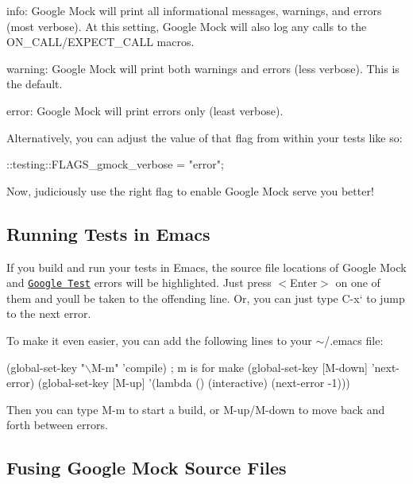 \begin{DoxyItemize}
\item {\ttfamily info}\+: Google Mock will print all informational messages, warnings, and errors (most verbose). At this setting, Google Mock will also log any calls to the {\ttfamily O\+N\+\_\+\+C\+A\+L\+L/\+E\+X\+P\+E\+C\+T\+\_\+\+C\+A\+LL} macros.
\item {\ttfamily warning}\+: Google Mock will print both warnings and errors (less verbose). This is the default.
\item {\ttfamily error}\+: Google Mock will print errors only (least verbose).
\end{DoxyItemize}

Alternatively, you can adjust the value of that flag from within your tests like so\+:


\begin{DoxyCode}
::testing::FLAGS\_gmock\_verbose = "error";
\end{DoxyCode}


Now, judiciously use the right flag to enable Google Mock serve you better!

\subsection*{Running Tests in Emacs}

If you build and run your tests in Emacs, the source file locations of Google Mock and \href{http://code.google.com/p/googletest/}{\tt Google Test} errors will be highlighted. Just press {\ttfamily $<$Enter$>$} on one of them and you\textquotesingle{}ll be taken to the offending line. Or, you can just type {\ttfamily C-\/x}` to jump to the next error.

To make it even easier, you can add the following lines to your {\ttfamily $\sim$/.emacs} file\+:


\begin{DoxyCode}
(global-set-key "\(\backslash\)M-m"   'compile)  ; m is for make
(global-set-key [M-down] 'next-error)
(global-set-key [M-up]   '(lambda () (interactive) (next-error -1)))
\end{DoxyCode}


Then you can type {\ttfamily M-\/m} to start a build, or {\ttfamily M-\/up}/{\ttfamily M-\/down} to move back and forth between errors.

\subsection*{Fusing Google Mock Source Files}

